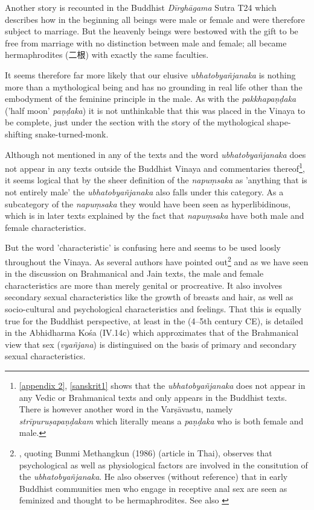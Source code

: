 Another story is recounted in the Buddhist {\em Dīrghāgama} Sutra T24 which describes how in the beginning all beings were male or female and were therefore subject to marriage. But the heavenly beings were bestowed with the gift to be free from marriage with no distinction between male and female; all became hermaphrodites (二根) with exactly the same faculties.

It seems therefore far more likely that our elusive {\em ubhatob­yañ­janaka} is nothing more than a mythological being and has no grounding in real life other than the embodyment of the feminine principle in the male. As with the {\em pakkhapaṇḍaka} ('half moon' {\em paṇḍaka}) it is not unthinkable that this was placed in the Vinaya to be complete, just under the section with the story of the mythological shape-shifting snake-turned-monk.

Although not mentioned in any of the texts and the word {\em ubhatob­yañ­janaka} does not appear in any texts outside the Buddhist Vinaya and commentaries thereof\footnote{\ref{appendix 2}, \ref{sanskrit1} shows that the {\em ubhatob­yañ­janaka} does not appear in any Vedic or Brahmanical texts and only appears in the Buddhist texts. There is however another word in the {\m Varṣāvastu}, namely {\em strīpuruṣapaṇḍakam} which literally means a {\em paṇḍaka} who is both female and male.}, it seems logical that by the sheer definition of the {\em napuṃsaka} as 'anything that is not entirely male' the {\em ubhatob­yañ­janaka} also falls under this category. As a subcategory of the {\em napuṃsaka} they would have been seen as hyperlibidinous, which is in later texts explained by the fact that {\em napuṃsaka} have both male and female characteristics. 

But the word 'characteristic' is confusing here and seems to be used loosly throughout the Vinaya. As several authors have pointed out\footnote{\cite{jackson}, quoting Bunmi Methangkun (1986) (article in Thai), observes that psychological as well as physiological factors are involved in the consitution of the {\em ubhatob­yañ­janaka}. He also observes (without reference) that in early Buddhist communities men who engage in receptive anal sex are seen as feminized and thought to be hermaphrodites. See also \cite{zwilling}} and as we have seen in the discussion on Brahmanical and Jain texts, the male and female characteristics are more than merely genital or procreative. It also involves secondary sexual characteristics like the growth of breasts and hair, as well as socio-cultural and psychological characteristics and feelings. That this is equally true for the Buddhist perspective, at least in the (4–5th century CE), is detailed in the Abhidharma Kośa (IV.14c) which approximates that of the Brahmanical view that sex ({\em vyañjana}) is distinguised on the basis of primary and secondary sexual characteristics.

